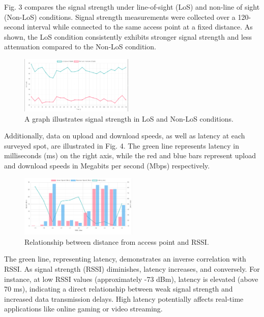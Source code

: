 \documentclass[conference]{IEEEtran}
\begin{document}
Fig. 3 compares the signal strength under line-of-sight (LoS) and non-line of sight (Non-LoS) conditions. Signal strength measurements were collected over a 120-second interval while connected to the same access point at a fixed distance. As shown, the LoS condition consistently exhibits stronger signal strength and less attenuation compared to the Non-LoS condition.

\begin{figure}[htbp]
    \centering
    \includegraphics[width=0.48\textwidth]{fig3_los_nonlos.png}
    \caption{A graph illustrates signal strength in LoS and Non-LoS conditions.}
    \label{fig:los_nonlos}
\end{figure}

Additionally, data on upload and download speeds, as well as latency at each surveyed spot, are illustrated in Fig. 4. The green line represents latency in milliseconds (ms) on the right axis, while the red and blue bars represent upload and download speeds in Megabits per second (Mbps) respectively.

\begin{figure}[htbp]
    \centering
    \includegraphics[width=0.5\textwidth]{fig4_speed_test.png}
    \caption{Relationship between distance from access point and RSSI.}
\end{figure}

The green line, representing latency, demonstrates an inverse correlation with RSSI. As signal strength (RSSI) diminishes, latency increases, and conversely. For instance, at low RSSI values (approximately -73 dBm), latency is elevated (above 70 ms), indicating a direct relationship between weak signal strength and increased data transmission delays. High latency potentially affects real-time applications like online gaming or video streaming.
\end{document}
